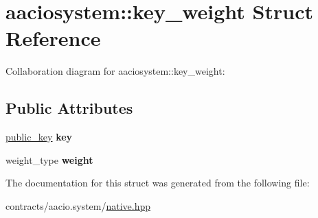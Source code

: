\hypertarget{structaaciosystem_1_1key__weight}{}\section{aaciosystem\+:\+:key\+\_\+weight Struct Reference}
\label{structaaciosystem_1_1key__weight}


Collaboration diagram for aaciosystem\+:\+:key\+\_\+weight\+:
\subsection*{Public Attributes}
\begin{DoxyCompactItemize}
\item 
\mbox{\label{structaaciosystem_1_1key__weight_a478eda539b7fd12d2c4329d7d43692a7}} 
\mbox{\hyperlink{structpublic__key}{public\+\_\+key}} {\bfseries key}
\item 
\mbox{\label{structaaciosystem_1_1key__weight_a7a2c44e1df495e7b2c4d7824ad780c57}} 
weight\+\_\+type {\bfseries weight}
\end{DoxyCompactItemize}


The documentation for this struct was generated from the following file\+:\begin{DoxyCompactItemize}
\item 
contracts/aacio.\+system/\mbox{\hyperlink{native_8hpp}{native.\+hpp}}\end{DoxyCompactItemize}
